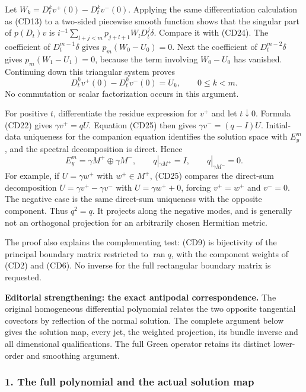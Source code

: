\documentclass[
  11pt,
]{article}
\begin{document}
Let \(W_k=D_t^kv^+(0)-D_t^kv^-(0)\). Applying the same differentiation
calculation as (CD13) to a two-sided piecewise smooth function shows
that the singular part of \(p(D_t)v\) is
\(i^{-1}\sum_{l+j<m}p_{j+l+1}W_lD_t^j\delta\). Compare it with (CD24).
The coefficient of \(D_t^{m-1}\delta\) gives \(p_m(W_0-U_0)=0\). Next
the coefficient of \(D_t^{m-2}\delta\) gives \(p_m(W_1-U_1)=0\), because
the term involving \(W_0-U_0\) has vanished. Continuing down this
triangular system proves \[
D_t^kv^+(0)-D_t^kv^-(0)=U_k,\qquad0\leq k<m.
\tag{CD25}
\] No commutation or scalar factorization occurs in this argument.

For positive \(t\), differentiate the residue expression for \(v^+\) and
let \(t\downarrow0\). Formula (CD22) gives \(\gamma v^+=qU\). Equation
(CD25) then gives \(\gamma v^-=(q-I)U\). Initial-data uniqueness for the
companion equation identifies the solution space with \(E_y^m\), and the
spectral decomposition is direct. Hence \[
E_y^m=\gamma M^+\oplus\gamma M^-,\qquad
q|_{\gamma M^+}=I,\qquad q|_{\gamma M^-}=0.
\tag{CD26}
\] For example, if \(U=\gamma w^+\) with \(w^+\in M^+\), (CD25) compares
the direct-sum decomposition \(U=\gamma v^+-\gamma v^-\) with
\(U=\gamma w^++0\), forcing \(v^+=w^+\) and \(v^-=0\). The negative case
is the same direct-sum uniqueness with the opposite component. Thus
\(q^2=q\). It projects along the negative modes, and is generally not an
orthogonal projection for an arbitrarily chosen Hermitian metric.

The proof also explains the complementing test: (CD9) is bijectivity of
the principal boundary matrix restricted to \(\operatorname{ran}q\),
with the component weights of (CD2) and (CD6). No inverse for the full
rectangular boundary matrix is requested.

\textbf{Editorial strengthening: the exact antipodal correspondence.}
The original homogeneous differential polynomial relates the two
opposite tangential covectors by reflection of the normal solution. The
complete argument below gives the solution map, every jet, the weighted
projection, its bundle inverse and all dimensional qualifications. The
full Green operator retains its distinct lower-order and smoothing
argument.

\subsubsection{1. The full polynomial and the actual solution
map}\label{the-full-polynomial-and-the-actual-solution-map}
\end{document}
